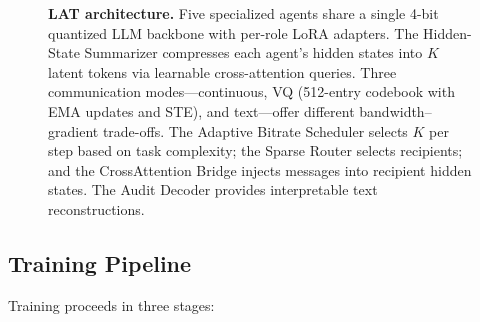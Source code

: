\documentclass{article}
\newcommand{\ours}{\textsc{LAT}}
\begin{document}
\begin{figure}[t]
\caption{\textbf{\ours{} architecture.}  Five specialized agents share a single 4-bit quantized LLM backbone with per-role LoRA adapters.  The Hidden-State Summarizer compresses each agent's hidden states into $K$ latent tokens via learnable cross-attention queries.  Three communication modes---continuous, VQ (512-entry codebook with EMA updates and STE), and text---offer different bandwidth--gradient trade-offs.  The Adaptive Bitrate Scheduler selects $K$ per step based on task complexity; the Sparse Router selects recipients; and the CrossAttention Bridge injects messages into recipient hidden states.  The Audit Decoder provides interpretable text reconstructions.}
\label{fig:architecture}
\end{figure}

\subsection{Training Pipeline}
\label{sec:training}

Training proceeds in three stages:
\end{document}
